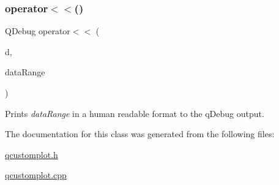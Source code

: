 \subsubsection{\texorpdfstring{operator$<$$<$()}{operator<<()}}
{\footnotesize\ttfamily Q\+Debug operator$<$$<$ (\begin{DoxyParamCaption}\item[{Q\+Debug}]{d,  }\item[{const \hyperlink{class_q_c_p_data_range}{Q\+C\+P\+Data\+Range} \&}]{data\+Range }\end{DoxyParamCaption})\hspace{0.3cm}{\ttfamily [related]}}

Prints {\itshape data\+Range} in a human readable format to the q\+Debug output. 

The documentation for this class was generated from the following files\+:\begin{DoxyCompactItemize}
\item 
\hyperlink{qcustomplot_8h}{qcustomplot.\+h}\item 
\hyperlink{qcustomplot_8cpp}{qcustomplot.\+cpp}\end{DoxyCompactItemize}
